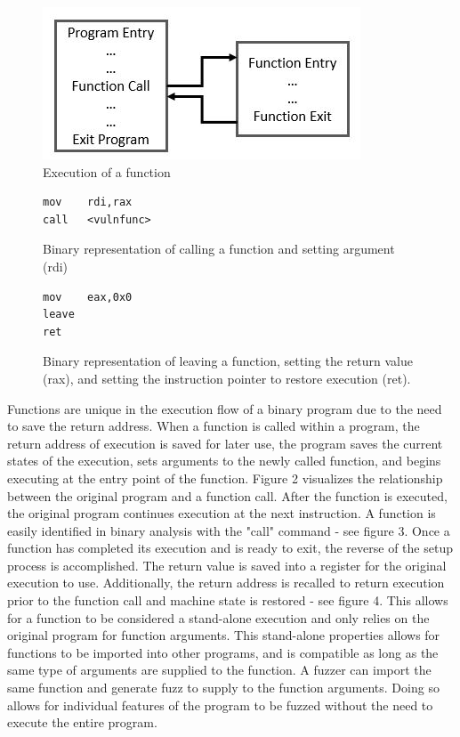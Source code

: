 \documentclass[conference]{IEEEtran}
\begin{document}
\begin{figure}
  \includegraphics[width=\linewidth]{Program_Execution.JPG}
  \caption{Execution of a function}
  \label{fig:Program_Execution}
\end{figure}

\begin{figure}
\begin{lstlisting}
mov    rdi,rax
call   <vulnfunc>
\end{lstlisting}
\caption{Binary representation of calling a function and setting argument (rdi)}
\end{figure}

\begin{figure}
\begin{lstlisting}
mov    eax,0x0
leave  
ret 
\end{lstlisting}
\caption{Binary representation of leaving a function, setting the return value (rax), and setting the instruction pointer to restore execution (ret).}
\end{figure}

Functions are unique in the execution flow of a binary program due to the need to save the return address. When a function is called within a program, the return address of execution is saved for later use, the program saves the current states of the execution, sets arguments to the newly called function, and begins executing at the entry point of the function. Figure 2 visualizes the relationship between the original program and a function call. After the function is executed, the original program continues execution at the next instruction. A function is easily identified in binary analysis with the "call" command - see figure 3. Once a function has completed its execution and is ready to exit, the reverse of the setup process is accomplished. The return value is saved into a register for the original execution to use. Additionally, the return address is recalled to return execution prior to the function call and machine state is restored - see figure 4. This allows for a function to be considered a stand-alone execution and only relies on the original program for function arguments. This stand-alone properties allows for functions to be imported into other programs, and is compatible as long as the same type of arguments are supplied to the function. A fuzzer can import the same function and generate fuzz to supply to the function arguments. Doing so allows for individual features of the program to be fuzzed without the need to execute the entire program. 
\end{document}
